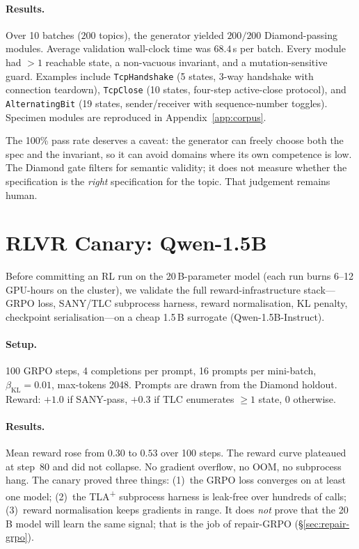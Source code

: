 \documentclass[11pt]{article}
\begin{document}
\paragraph{Results.}
Over 10 batches ($200$ topics), the generator yielded
$200/200$ Diamond-passing modules.  Average validation wall-clock
time was $68.4$\,s per batch.  Every module had $>1$ reachable
state, a non-vacuous invariant, and a mutation-sensitive guard.
Examples include \texttt{TcpHandshake} (5 states, 3-way handshake
with connection teardown), \texttt{TcpClose} (10 states, four-step
active-close protocol), and \texttt{AlternatingBit} (19 states,
sender/receiver with sequence-number toggles).  Specimen modules are
reproduced in Appendix~\ref{app:corpus}.

The 100\% pass rate deserves a caveat: the generator can freely
choose both the spec and the invariant, so it can avoid domains where
its own competence is low.  The Diamond gate filters for semantic
validity; it does not measure whether the specification is the
\emph{right} specification for the topic.  That judgement remains
human.

\section{RLVR Canary: Qwen-1.5B}
\label{sec:canary}

Before committing an RL run on the 20\,B-parameter model (each run
burns 6--12 GPU-hours on the cluster), we validate the full
reward-infrastructure stack---GRPO loss, SANY/TLC subprocess harness,
reward normalisation, KL penalty, checkpoint serialisation---on a
cheap 1.5\,B surrogate (Qwen-1.5B-Instruct).

\paragraph{Setup.}  100 GRPO steps, 4 completions per prompt, 16
prompts per mini-batch, $\beta_\text{KL}=0.01$, max-tokens 2048.
Prompts are drawn from the Diamond holdout.  Reward: $+1.0$ if
SANY-pass, $+0.3$ if TLC enumerates $\geq 1$ state, $0$ otherwise.

\paragraph{Results.}
Mean reward rose from $0.30$ to $0.53$ over 100 steps.  The reward
curve plateaued at step~80 and did not collapse.  No gradient overflow,
no OOM, no subprocess hang.  The canary proved three things:
(1)~the GRPO loss converges on at least one model;
(2)~the TLA\textsuperscript{+} subprocess harness is leak-free over
hundreds of calls; (3)~reward normalisation keeps gradients in range.
It does \emph{not} prove that the 20\,B model will learn the same
signal; that is the job of repair-GRPO (\S\ref{sec:repair-grpo}).
\end{document}
